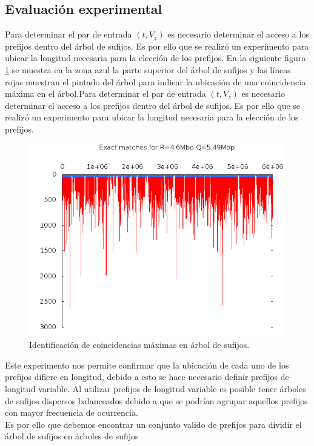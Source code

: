 \documentclass[12pt,a4paper]{article}
\begin{document}
\subsection{Evaluación experimental}
Para determinar el par de entrada $(t,V_{z})$ es necesario determinar el acceso a los prefijos dentro del
árbol de sufijos. Es por ello que se realizó un experimento para ubicar la longitud necesaria para la 
elección de los prefijos. En la siguiente figura \ref{fig:top} se muestra en la zona azul la parte superior
del árbol de sufijos y las líneas rojas muestran el pintado del árbol para indicar la ubicación de una 
coincidencia máxima en el árbol.Para determinar el par de entrada $(t,V_{z})$ es necesario determinar el acceso a los prefijos dentro del
árbol de sufijos. Es por ello que se realizó un experimento para ubicar la longitud necesaria para la 
elección de los prefijos. 
\begin{figure}[h]
\begin{center}
\includegraphics[scale=0.4]{freq.png}
\caption{Identificación de coincidencias máximas en árbol de sufijos.}
\label{fig:top}
\end{center}
\end{figure}
Este experimento nos permite confirmar que la ubicación de cada uno de los prefijos difiere en longitud, debido a 
esto se hace necesario definir prefijos de longitud variable. Al utilizar prefijos de longitud variable es posible
tener árboles de sufijos dispersos balanceados debido a que se podrían agrupar aquellos prefijos con mayor frecuencia
de ocurrencia.\\
Es por ello que debemos encontrar un conjunto valido de prefijos para dividir el árbol de sufijos en árboles de sufijos
\end{document}
